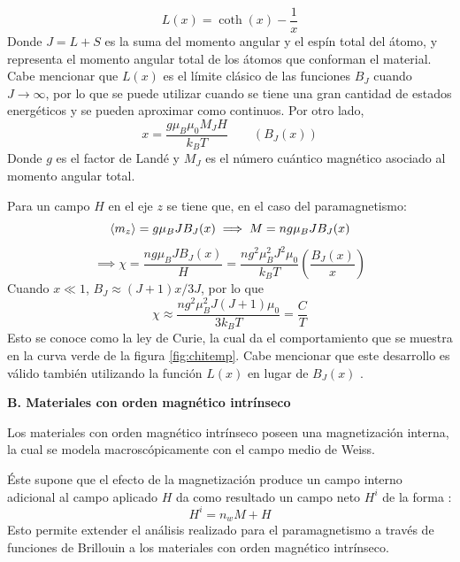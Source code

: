 \documentclass[../main.tex]{subfiles}
\begin{document}
\begin{itemize}
\begin{equation}
        L(x)=\coth(x)-\dfrac{1}{x}
        \label{eq:Langevin}
    \end{equation}
    Donde $J=L+S$ es la suma del momento angular y el espín total del átomo, y representa el momento angular total de los átomos que conforman el material. Cabe mencionar que $L(x)$ es el límite clásico de las funciones $B_J$ cuando $J\rightarrow\infty$, por lo que se puede utilizar cuando se tiene una gran cantidad de estados energéticos y se pueden aproximar como continuos. Por otro lado,
    \begin{equation}
        x=\dfrac{g\mu_B\mu_0M_JH}{k_BT}\qquad (B_J(x))
        \label{eq:xBrillouin}
    \end{equation}
    Donde $g$ es el factor de Landé y $M_J$ es el número cuántico magnético asociado al momento angular total.

    Para un campo $H$ en el eje $z$ se tiene que, en el caso del paramagnetismo:
    \begin{equation}
            \langle m_z \rangle=g\mu_BJB_J(x) \implies M=ng\mu_B J B_J(x)
        \label{eq:momentozetaparam}
    \end{equation}
    \begin{equation}
        \implies \chi=\dfrac{ng\mu_B J B_J(x)}{H}=\dfrac{n g^2 \mu_B^2 J^2 \mu_0}{k_BT}\left(\dfrac{B_J(x)}{x}\right)
        \label{eq:chiparam}
    \end{equation}
    Cuando $x\ll1$, $B_J\approx(J+1)x/3J$, por lo que
    \begin{equation}
        \chi\approx\dfrac{ng^2\mu_B^2J(J+1)\mu_0}{3k_BT}=\dfrac{C}{T}
        \label{eq:leycurie}
    \end{equation}
    Esto se conoce como la ley de Curie, la cual da el comportamiento que se muestra en la curva verde de la figura \ref{fig:chitemp}. Cabe mencionar que este desarrollo es válido también utilizando la función $L(x)$ en lugar de $B_J(x)$ \cite{coey2010magnetism}.
\end{itemize}
\textbf{B. Materiales con orden magnético intrínseco}

Los materiales con orden magnético intrínseco poseen una magnetización interna, la cual se modela macroscópicamente con el campo medio de Weiss.

Éste supone que el efecto de la magnetización produce un campo interno adicional al campo aplicado $H$ da como resultado un campo neto $H^i$ de la forma \cite{coey2010magnetism}:
\begin{equation}
    H^i=n_wM+H
    \label{eq:Weiss}
\end{equation}
Esto permite extender el análisis realizado para el paramagnetismo a través de funciones de Brillouin a los materiales con orden magnético intrínseco.
\end{document}
